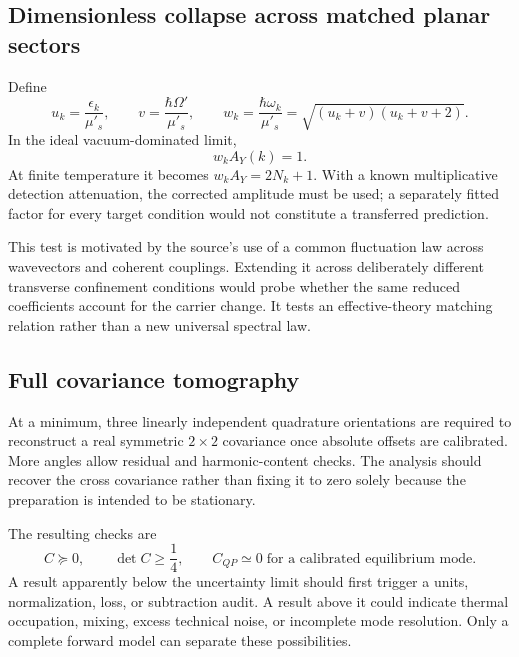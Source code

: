 \documentclass[11pt,a4paper]{article}
\theoremstyle{definition}
\theoremstyle{remark}
\newcommand{\musp}{\mu'_s}
\begin{document}
\subsection{Dimensionless collapse across matched planar sectors}
Define
\begin{equation}
 u_k=\frac{\epsilon_k}{\musp},\qquad
 v=\frac{\hbar\Omega'}{\musp},\qquad
 w_k=\frac{\hbar\omega_k}{\musp}
     =\sqrt{(u_k+v)(u_k+v+2)}.
 \label{eq:dimensionless}
\end{equation}
In the ideal vacuum-dominated limit,
\begin{equation}
 w_k A_Y(k)=1.
 \label{eq:vacuum_collapse}
\end{equation}
At finite temperature it becomes $w_kA_Y=2N_k+1$. With a known multiplicative detection attenuation, the corrected amplitude must be used; a separately fitted factor for every target condition would not constitute a transferred prediction.

This test is motivated by the source's use of a common fluctuation law across wavevectors and coherent couplings. Extending it across deliberately different transverse confinement conditions would probe whether the same reduced coefficients account for the carrier change. It tests an effective-theory matching relation rather than a new universal spectral law.\cite{zhang2026}

\subsection{Full covariance tomography}
At a minimum, three linearly independent quadrature orientations are required to reconstruct a real symmetric $2\times2$ covariance once absolute offsets are calibrated. More angles allow residual and harmonic-content checks. The analysis should recover the cross covariance rather than fixing it to zero solely because the preparation is intended to be stationary.

The resulting checks are
\begin{equation}
 C\succeq0,\qquad \det C\geq\frac14,
 \qquad C_{QP}\simeq0\;\text{for a calibrated equilibrium mode}.
 \label{eq:tomography_checks}
\end{equation}
A result apparently below the uncertainty limit should first trigger a units, normalization, loss, or subtraction audit. A result above it could indicate thermal occupation, mixing, excess technical noise, or incomplete mode resolution. Only a complete forward model can separate these possibilities.\cite{weedbrook}
\end{document}
